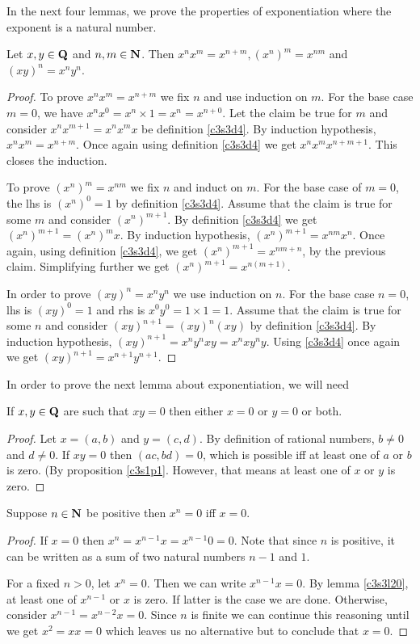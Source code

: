 In the next four lemmas, we prove the properties of exponentiation where
the exponent is a natural number.
\begin{lem}\label{c3s3e19}
Let $x, y \in \mathbf{Q}$ and $n, m \in \mathbf{N}$. Then $x^n x^m = x^{n + m}, 
(x^n)^m = x^{nm}$ and $(xy)^n = x^n y^n$.
\end{lem}
\begin{proof}
To prove $x^n x^m = x^{n + m}$ we fix $n$ and use induction on $m$. For the
base case $m = 0$, we have $x^n x^0 = x^n \times 1 = x^n = x^{n + 0}$. Let
the claim be true for $m$ and consider $x^n x^{m+1} = x^n x^m x$ be 
definition \ref{c3s3d4}. By induction hypothesis, $x^n x^m = x^{n+m}$. Once
again using definition \ref{c3s3d4} we get $x^n x^m x^{n+m+1}$. This closes
the induction.

To prove $(x^n)^m = x^{nm}$ we fix $n$ and induct on $m$. For the base
case of $m = 0$, the lhs is $(x^n)^0 = 1$ by definition \ref{c3s3d4}. 
Assume that the claim is true for some $m$ and consider $(x^n)^{m+1}$. By
definition \ref{c3s3d4} we get $(x^n)^{m+1} = (x^n)^m x$. By induction 
hypothesis, $(x^n)^{m+1} = x^{nm}x^n$. Once again, using definition 
\ref{c3s3d4}, we get $(x^n)^{m+1} = x^{nm+n}$, by the previous claim.
Simplifying further we get $(x^n)^{m+1} = x^{n(m+1)}$.

In order to prove $(xy)^n = x^n y^n$ we use induction on $n$. For the
base case $n = 0$, lhs is $(xy)^0 = 1$ and rhs is $x^0 y^0 = 1 \times 1 = 
1$. Assume that the claim is true for some $n$ and consider $(xy)^{n+1} =
(xy)^n (xy)$ by definition \ref{c3s3d4}. By induction hypothesis, 
$(xy)^{n+1} = x^ny^n xy = x^n x y^n y$. Using \ref{c3s3d4} once again
we get $(xy)^{n+1} = x^{n+1} y^{n+1}$.
\end{proof}

In order to prove the next lemma about exponentiation, we will need
\begin{lem}\label{c3s3l20}
If $x, y \in \mathbf{Q}$ are such that $xy = 0$ then either $x = 0$ or $y = 0$
or both.
\end{lem}
\begin{proof}
Let $x = (a, b)$ and $y = (c, d)$. By definition of rational numbers, $b
\ne 0$ and $d \ne 0$. If $xy = 0$ then $(ac, bd) = 0$, which is possible 
iff at least one of $a$ or $b$ is zero. (By proposition \ref{c3s1p1}. 
However, that means at least one of $x$ or $y$ is zero.
\end{proof}

\begin{lem}\label{c3s3l21}
Suppose $n \in \mathbf{N}$ be positive then $x^n = 0$ iff $x = 0$.
\end{lem}
\begin{proof}
If $x = 0$ then $x^n = x^{n-1}x = x^{n-1}0 = 0$. Note that since $n$ is
positive, it can be written as a sum of two natural numbers $n-1$ and $1$.

For a fixed $n > 0$, let $x^n = 0$. Then we can write $x^{n-1}x = 0$. By
lemma \ref{c3s3l20}, at least one of $x^{n-1}$ or $x$ is zero. If latter
is the case we are done. Otherwise, consider $x^{n-1} = x^{n-2}x = 0$. 
Since $n$ is finite we can continue this reasoning until we get $x^2 = xx
= 0$ which leaves us no alternative but to conclude that $x = 0$.
\end{proof}

